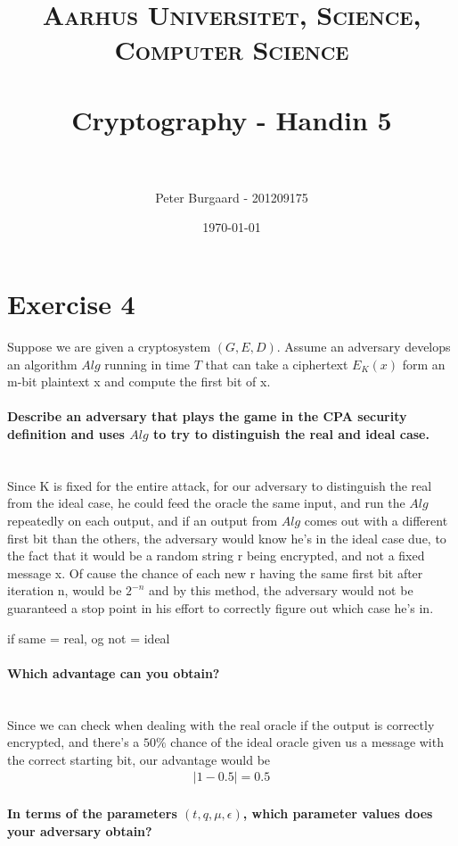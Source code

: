 \documentclass[paper=a4, fontsize=11pt]{scrartcl} %
\title{	
	\normalfont \normalsize 
	\textsc{Aarhus Universitet, Science, Computer Science} \\ [25pt] %
	\horrule{0.5pt} \\[0.4cm] %
	\huge Cryptography - Handin 5 \\ %
	\horrule{2pt} \\[0.5cm] %
}
\author{Peter Burgaard - 201209175} %
\date{\normalsize\today} %
\numberwithin{equation}{section} %
\numberwithin{figure}{section} %
\numberwithin{table}{section} %
\begin{document}
\maketitle

\section{Exercise 4}

Suppose we are given a cryptosystem $(G,E,D)$. Assume an adversary develops an algorithm $Alg$ running in time $T$ that can take a ciphertext $E_K(x)$ form an m-bit plaintext x and compute the first bit of x. 

\paragraph{Describe an adversary that plays the game in the CPA security definition and uses $Alg$ to try to distinguish the real and ideal case.}  \hspace{1cm} \\

Since K is fixed for the entire attack, for our adversary to distinguish the real from the ideal case, he could feed the oracle the same input, and run the $Alg$ repeatedly on each output, and if an output from $Alg$ comes out with a different first bit than the others, the adversary would know he's in the ideal case due, to the fact that it would be a random string r being encrypted, and not a fixed message x. Of cause the chance of each new r having the same first bit after iteration n, would be $2^{-n}$ and by this method, the adversary would not be guaranteed a stop point in his effort to correctly figure out which case he's in. 

if same = real, og not = ideal

\paragraph{Which advantage can you obtain?} \hspace{1cm} \\

Since we can check when dealing with the real oracle if the output is correctly encrypted, and there's a $50\%$ chance of the ideal oracle given us a message with the correct starting bit, our advantage would be
\begin{align*}
|1-0.5|=0.5
\end{align*}

\paragraph{In terms of the parameters $(t,q,\mu, \epsilon)$, which parameter values does your adversary obtain?} \hspace{1cm} \\
\end{document}
